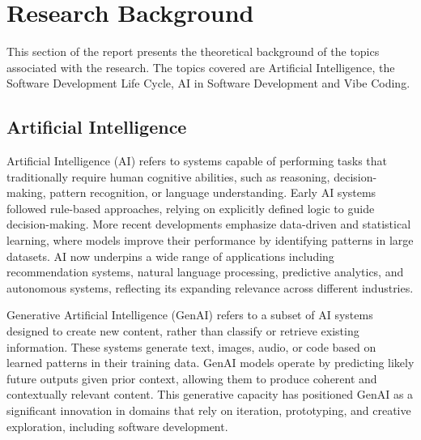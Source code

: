 \section{Research Background}

This section of the report presents the theoretical background of the topics associated with the research. The topics covered are Artificial Intelligence, the Software Development Life Cycle, AI in Software Development and Vibe Coding.


\subsection{Artificial Intelligence}

Artificial Intelligence (AI) refers to systems capable of performing tasks that traditionally require human cognitive abilities, such as reasoning, decision-making, pattern recognition, or language understanding. Early AI systems followed rule-based approaches, relying on explicitly defined logic to guide decision-making. More recent developments emphasize data-driven and statistical learning, where models improve their performance by identifying patterns in large datasets. AI now underpins a wide range of applications including recommendation systems, natural language processing, predictive analytics, and autonomous systems, reflecting its expanding relevance across different industries.

Generative Artificial Intelligence (GenAI) refers to a subset of AI systems designed to create new content, rather than classify or retrieve existing information. These systems generate text, images, audio, or code based on learned patterns in their training data. GenAI models operate by predicting likely future outputs given prior context, allowing them to produce coherent and contextually relevant content. This generative capacity has positioned GenAI as a significant innovation in domains that rely on iteration, prototyping, and creative exploration, including software development.

